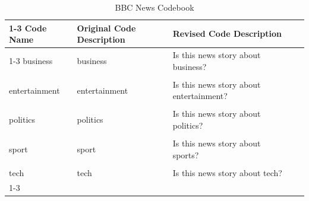 \documentclass{article}
\begin{document}
\begin{table}[!htb] %
\caption{BBC News Codebook}
\vspace*{2.5mm}
\begin{tabular}{@{}lllll@{}}
\cmidrule(r){1-3}
\textbf{Code   Name} & \textbf{Original   Code Description} & \textbf{Revised   Code Description}     &  &  \\ \cmidrule(r){1-3}
business & business & Is this news story about business? &  &  \\ \\
entertainment        & entertainment                        & Is this news story about entertainment? &  &  \\ \\
politics & politics & Is this news story about politics? &  &  \\ \\
sport    & sport    & Is this news story about sports?   &  &  \\ \\
tech     & tech     & Is this news story about tech?     &  &  \\ \cmidrule(r){1-3}
\end{tabular}
\end{table}
\end{document}
